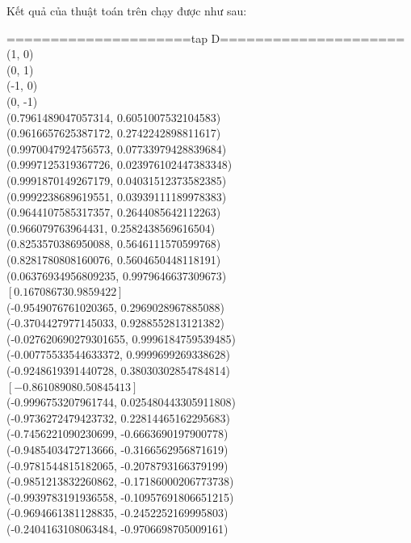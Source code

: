 \documentclass[12pt,a4paper,openany,oneside]{report}
\begin{document}
Kết quả của thuật toán trên chạy được như sau:

=====================tap D=====================\\
(1, 0)\\
(0, 1)\\
(-1, 0)\\
(0, -1)\\
(0.7961489047057314, 0.6051007532104583)\\
(0.9616657625387172, 0.2742242898811617)\\
(0.9970047924756573, 0.07733979428839684)\\
(0.9997125319367726, 0.023976102447383348)\\
(0.9991870149267179, 0.04031512373582385)\\
(0.9992238689619551, 0.03939111189978383)\\
(0.9644107585317357, 0.2644085642112263)\\
(0.966079763964431, 0.2582438569616504)\\
(0.8253570386950088, 0.5646111570599768)\\
(0.8281780808160076, 0.5604650448118191)\\
(0.06376934956809235, 0.9979646637309673)\\
$[0.16708673 0.9859422]$\\
(-0.9549076761020365, 0.2969028967885088)\\
(-0.3704427977145033, 0.9288552813121382)\\
(-0.027620690279301655, 0.9996184759539485)\\
(-0.00775533544633372, 0.9999699269338628)\\
(-0.9248619391440728, 0.38030302854784814)\\
$[-0.86108908  0.50845413]$\\
(-0.9996753207961744, 0.025480443305911808)\\
(-0.9736272479423732, 0.22814465162295683)\\
(-0.7456221090230699, -0.6663690197900778)\\
(-0.9485403472713666, -0.3166562956871619)\\
(-0.9781544815182065, -0.2078793166379199)\\
(-0.9851213832260862, -0.17186000206773738)\\
(-0.9939783191936558, -0.10957691806651215)\\
(-0.9694661381128835, -0.2452252169995803)\\
(-0.2404163108063484, -0.9706698705009161)\\
\end{document}
